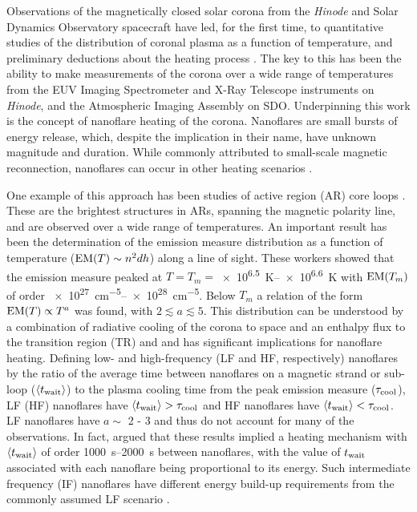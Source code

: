 Observations of the magnetically closed solar corona from the \textit{Hinode} \citep{kosugi_hinode_2007} and Solar Dynamics Observatory \citep[SDO,][]{pesnell_solar_2012} spacecraft have led, for the first time, to quantitative studies of the distribution of coronal plasma as a function of temperature, and preliminary deductions about the heating process \citep[see papers in][]{de_moortel_recent_2015}. The key to this has been the ability to make measurements of the corona over a wide range of temperatures from the EUV Imaging Spectrometer \citep[EIS,][]{culhane_euv_2007} and X-Ray Telescope \citep[XRT,][]{golub_x-ray_2007} instruments on \textit{Hinode}, and the Atmospheric Imaging Assembly \citep[AIA,][]{lemen_atmospheric_2012} on SDO. Underpinning this work is the concept of nanoflare heating of the corona. Nanoflares \citep[e.g.][]{parker_nanoflares_1988} are small bursts of energy release, which, despite the implication in their name, have unknown magnitude and duration. While commonly attributed to small-scale magnetic reconnection, nanoflares can occur in other heating scenarios \citep[e.g.][]{ofman_self-consistent_1998}.

One example of this approach has been studies of active region (AR) core loops \citep{warren_constraints_2011,warren_systematic_2012,winebarger_using_2011,tripathi_emission_2011,schmelz_cold_2012,bradshaw_diagnosing_2012,reep_diagnosing_2013,del_zanna_evolution_2015}. These are the brightest structures in ARs, spanning the magnetic polarity line, and are observed over a wide range of temperatures. An important result has been the determination of the emission measure distribution as a function of temperature ($\emd[T]\sim n^2dh$) along a line of sight. These workers showed that the emission measure peaked at $T = T_m = $\SIrange{e6.5}{e6.6}{\kelvin} with $\emd[T_m]$ of order \SIrange{e27}{e28}{\cm\tothe{-5}}. Below $T_m$ a relation of the form $\emd[T] \propto T^a$ was found, with $2\lesssim a\lesssim 5$. This distribution can be understood by a combination of radiative cooling of the corona to space and an enthalpy flux to the transition region (TR) \citep[e.g.][]{bradshaw_cooling_2010,bradshaw_new_2010} and and has significant implications for nanoflare heating. Defining low- and high-frequency (LF and HF, respectively) nanoflares by the ratio of the average time between nanoflares on a magnetic strand or sub-loop ($\langle t_\textup{wait} \rangle$) to the plasma cooling time from the peak emission measure ($\tau_\textup{cool}$), LF (HF) nanoflares have $\langle t_\textup{wait} \rangle > \tau_\textup{cool}$ and HF nanoflares have $\langle t_\textup{wait} \rangle < \tau_\textup{cool}$. LF nanoflares have $a \sim$ 2 - 3 and thus do not account for many of the observations. In fact, \citet{cargill_active_2014} argued that these results implied a heating mechanism with $\langle t_\textup{wait} \rangle$ of order \SIrange{1000}{2000}{\second} between nanoflares, with the value of $t_\textup{wait}$ associated with each nanoflare being proportional to its energy. Such intermediate frequency (IF) nanoflares have different energy build-up requirements from the commonly assumed LF scenario \citep{cargill_active_2014}.

